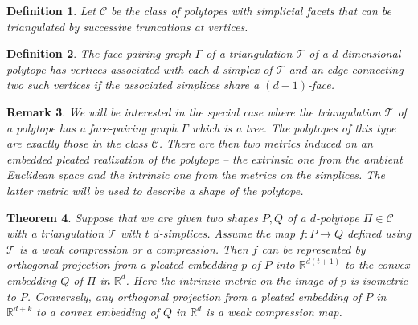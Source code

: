 \documentclass[a4paper, 12pt]{amsart}
\theoremstyle{plain}
\newtheorem{Thm}{Theorem}
\newtheorem{Def}[Thm]{Definition}
\newtheorem{Rem}[Thm]{Remark}
\begin{document}
\begin{Def}
Let $\mathcal{C}$ be the class of polytopes with simplicial facets that can be triangulated by successive truncations at vertices. 
\end{Def}


\begin{Def}
The face-pairing graph $\Gamma$ of a triangulation $\mathcal T$ of a $d$-dimensional polytope has vertices associated with each $d$-simplex of $\mathcal T$ and an edge connecting two such vertices if the associated simplices share a $(d-1)$-face. 

\end{Def}

\begin{Rem}
We will be interested in the special case where the  triangulation $\mathcal T$ of a polytope has a face-pairing graph $\Gamma$ which is a tree. The polytopes of this type are exactly those in the class $\mathcal C$. There are then two metrics induced on an embedded pleated realization of the polytope -- the extrinsic one from the ambient Euclidean space and the intrinsic one from the metrics on the simplices. The latter metric will be used to describe a shape of the polytope. 
\end{Rem}

\begin{Thm} \label{pleated}
Suppose that we are given two shapes $P, Q$ of a $d$-polytope $\Pi \in \mathcal{C}$ with a triangulation $\mathcal{T}$ with $t$ $d$-simplices. Assume the map $f:P \to Q$ defined using $\mathcal{T}$ is a weak compression or a compression. Then $f$ can be represented by orthogonal projection from a pleated embedding $p$ of $P$ into $\mathbb{R}^{d(t+1)}$ to the convex embedding $Q$ of $\Pi$ in $\mathbb{R}^d$. Here the intrinsic metric on the image of $p$ is isometric to $P$.  Conversely, any orthogonal projection from a pleated embedding of $P$ in $\mathbb{R}^{d+k}$ to a convex embedding of $Q$ in $\mathbb{R}^d$ is a weak compression map.
\end{Thm}
\end{document}
